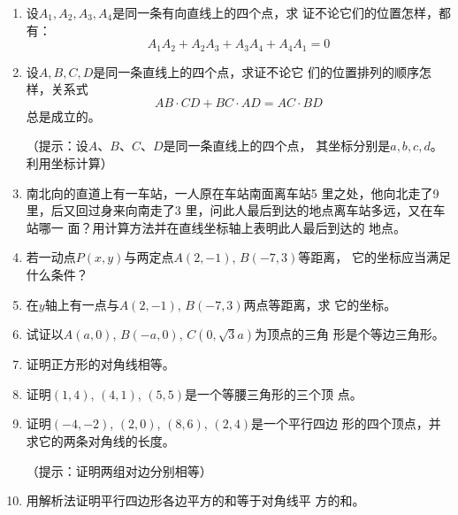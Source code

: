 \begin{enumerate}
    \item 设$A_1,A_2,A_3,A_4$是同一条有向直线上的四个点，求
证不论它们的位置怎样，都有：
\[A_1A_2+A_2A_3+A_3A_4+A_4A_1=0\]
\item 设$A,B,C,D$是同一条直线上的四个点，求证不论它
们的位置排列的顺序怎样，关系式
\[AB\cdot CD+BC\cdot AD=AC\cdot BD\]
总是成立的。

（提示：设$A$、$B$、$C$、$D$是同一条直线上的四个点，
其坐标分别是$a,b,c,d$。利用坐标计算）

\item 南北向的直道上有一车站，一人原在车站南面离车站5
里之处，他向北走了9里，后又回过身来向南走了3
里，问此人最后到达的地点离车站多远，又在车站哪一
面？用计算方法并在直线坐标轴上表明此人最后到达的
地点。
\item 若一动点$P(x,y)$与两定点$A(2,-1)$, $B(-7,3)$等距离，
它的坐标应当满足什么条件？
\item  在$y$轴上有一点与$A(2,-1)$, $B(-7,3)$两点等距离，求
它的坐标。
\item  试证以$A(a,0)$, $B(-a,0)$, $C(0,\sqrt{3}a)$为顶点的三角
形是个等边三角形。
\item 证明正方形的对角线相等。
\item  证明$(1,4)$, $(4,1)$, $(5,5)$是一个等腰三角形的三个顶
点。
\item  证明$(-4,-2)$, $(2,0)$, $(8,6)$, $(2,4)$是一个平行四边
形的四个顶点，并求它的两条对角线的长度。

（提示：证明两组对边分别相等）
\item 用解析法证明平行四边形各边平方的和等于对角线平
方的和。
\end{enumerate}


